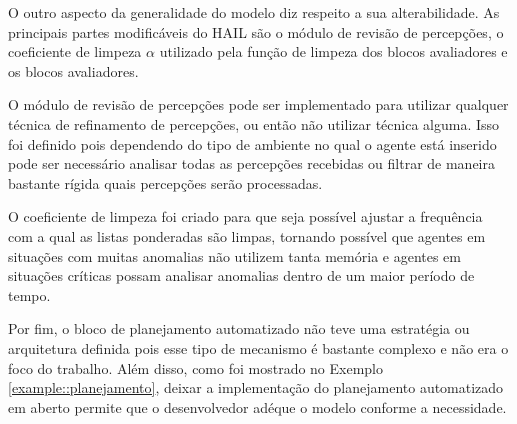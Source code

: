 O outro aspecto da generalidade do modelo diz respeito a sua alterabilidade. As principais partes modificáveis do HAIL são o módulo de revisão de percepções, o coeficiente de limpeza $\alpha$ utilizado pela função de limpeza dos blocos avaliadores e os blocos avaliadores.

O módulo de revisão de percepções pode ser implementado para utilizar qualquer técnica de refinamento de percepções, ou então não utilizar técnica alguma. Isso foi definido pois dependendo do tipo de ambiente no qual o agente está inserido pode ser necessário analisar todas as percepções recebidas ou filtrar de maneira bastante rígida quais percepções serão processadas.

O coeficiente de limpeza foi criado para que seja possível ajustar a frequência com a qual as listas ponderadas são limpas, tornando possível que agentes em situações com muitas anomalias não utilizem tanta memória e agentes em situações críticas possam analisar anomalias dentro de um maior período de tempo.

Por fim, o bloco de planejamento automatizado não teve uma estratégia ou arquitetura definida pois esse tipo de mecanismo é bastante complexo e não era o foco do trabalho. Além disso, como foi mostrado no Exemplo \ref{example::planejamento}, deixar a implementação do planejamento automatizado em aberto permite que o desenvolvedor adéque o modelo conforme a necessidade.